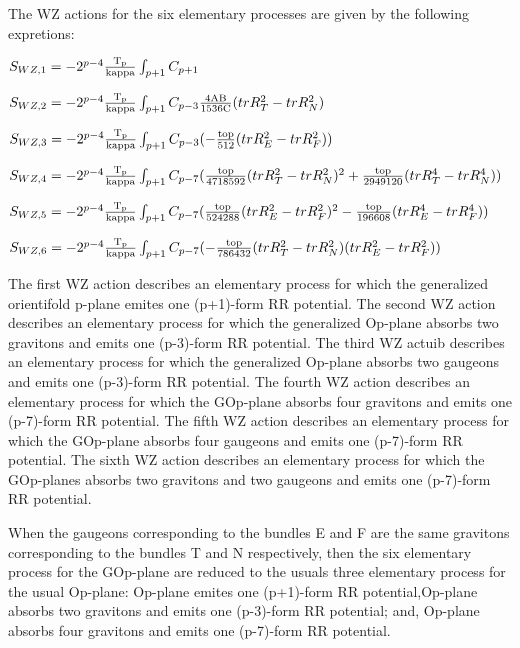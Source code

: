 \documentclass[a4paper,a4paper]{article}
\begin{document}
The WZ actions for the six elementary processes are given by the following 
expretions:
\begin{center}
{  $ S_{WZ,1} = -2^{p-4}\frac{\rm T_p}{\rm kappa}\int_{p+1} C_{p+1}$ }
\end{center} 
\begin{center}
{  $ S_{WZ,2} = -2^{p-4}\frac{\rm T_p}{\rm kappa}\int_{p+1} C_{p-3}{\frac{\rm 4AB}{\rm 1536C}}{(trR_T^2- trR_N^2)}$ }
\end{center}
\begin{center}
{  $ S_{WZ,3} = -2^{p-4}\frac{\rm T_p}{\rm kappa}\int_{p+1} C_{p-3}(-  \frac{\rm top}{\rm 512}{(trR_E^2- trR_F^2)})$ }
\end{center}
\begin{center}
{  $ S_{WZ,4} = -2^{p-4}\frac{\rm T_p}{\rm kappa}\int_{p+1} C_{p-7}(\frac{\rm top}{\rm 4718592}{{(trR_T^2- trR_N^2)^2}}+\frac{\rm top}{\rm 2949120}{(trR_T^4- trR_N^4)})$ }
\end{center}
\begin{center}
{  $ S_{WZ,5} = -2^{p-4}\frac{\rm T_p}{\rm kappa}\int_{p+1} C_{p-7}(\frac{\rm top}{\rm 524288}{{(trR_E^2-trR_F^2)^2}}-\frac{\rm top}{\rm 196608}{(trR_E^4- trR_F^4)})$ }
\end{center}
\begin{center}
{  $ S_{WZ,6} = -2^{p-4}\frac{\rm T_p}{\rm kappa}\int_{p+1} C_{p-7}(-\frac{\rm top}{\rm 786432}{(trR_T^2- trR_N^2)(trR_E^2- trR_F^2)})$ }
\end{center}

The first WZ action describes an elementary process for which the generalized orientifold p-plane emites one (p+1)-form RR potential.
The second WZ action describes an elementary process for which the generalized
Op-plane absorbs two gravitons and emits one (p-3)-form RR potential.
The third WZ actuib describes an elementary process for which the generalized Op-plane absorbs two gaugeons and emits one (p-3)-form RR potential.
The fourth WZ action describes an elementary process for which the GOp-plane absorbs four gravitons and emits one (p-7)-form RR potential. 
The fifth WZ action describes an elementary process for which the GOp-plane absorbs four gaugeons and emits one (p-7)-form RR potential.
The sixth WZ action describes an elementary process for which the GOp-planes absorbs two gravitons and two gaugeons and emits one (p-7)-form RR potential.

When the gaugeons corresponding to the bundles E and F are the same gravitons corresponding to the bundles T and N respectively, then the six elementary process for the GOp-plane are reduced to the usuals three elementary process for the usual Op-plane: Op-plane emites one (p+1)-form RR potential,Op-plane
absorbs two gravitons and emits one (p-3)-form RR potential; and, Op-plane absorbs four gravitons and emits one (p-7)-form RR potential.
  
\end{document}
